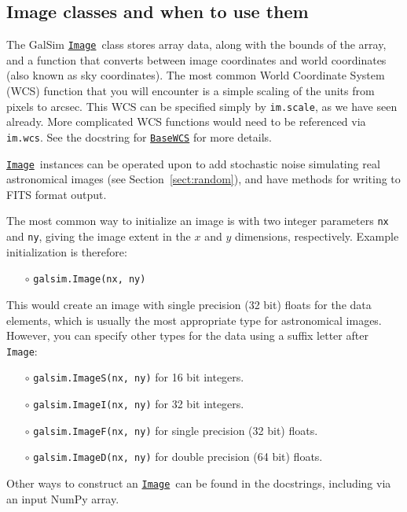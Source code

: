 \documentclass[preprint,10pt]{../../devel/modules/aastex}
\newcommand\Image{\href{http://galsim-developers.github.io/GalSim/classgalsim_1_1image_1_1_image.html}{\texttt{Image}}}
\begin{document}
\subsection{Image classes and when to use them}\label{sect:imageclasses}
The GalSim \Image\ class stores array data, along with the bounds
of the array, and a
function that converts between image coordinates and world coordinates
(also known as sky coordinates).  The most common World Coordinate System
(WCS) function that you will encounter is a simple scaling of the units
from pixels to arcsec.  This WCS can be specified simply by \texttt{im.scale},
as we have seen already.  More complicated WCS functions would need to
be referenced via \texttt{im.wcs}.
See the docstring for \href{http://galsim-developers.github.io/GalSim/classgalsim_1_1wcs_1_1_base_w_c_s.html}{\texttt{BaseWCS}}
for more details.

\Image\ instances can be operated upon to add stochastic noise
simulating real astronomical images (see Section~\ref{sect:random}),
and have methods for writing to FITS format output.

The most common way to initialize an
image is with two integer parameters \texttt{nx} and \texttt{ny},
giving the image extent in the $x$ and $y$ dimensions, respectively.
Example initialization is therefore:
\begin{itemize}
  \item[$\circ$] \texttt{galsim.Image(nx, ny)}
\end{itemize}
This would create an image with single precision (32 bit) floats for the data elements, which
is usually the most appropriate type for astronomical images.  However, you can specify
other types for the data using a suffix letter after \texttt{Image}:
\begin{itemize}
  \item[$\circ$] \texttt{galsim.ImageS(nx, ny)} {for 16 bit integers.}

  \item[$\circ$] \texttt{galsim.ImageI(nx, ny)} {for 32 bit integers.}

  \item[$\circ$] \texttt{galsim.ImageF(nx, ny)} {for single precision (32 bit) floats.}

  \item[$\circ$] \texttt{galsim.ImageD(nx, ny)} {for double precision (64 bit) floats.}
\end{itemize}
Other ways to construct an \Image\ can be found in the
docstrings, including via an input NumPy array.
\end{document}
